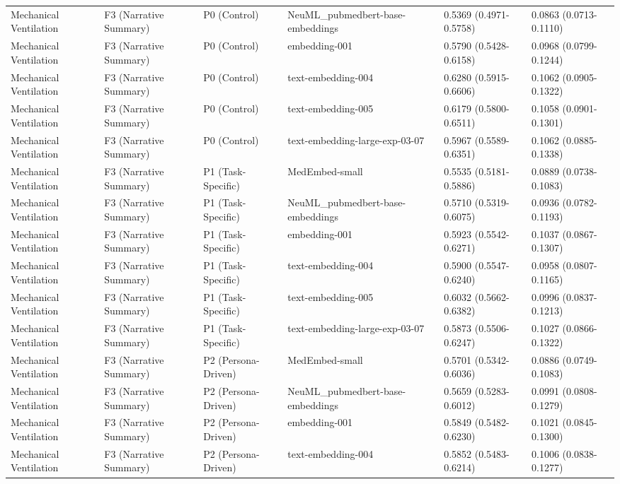 \begin{tabular}{llllll}
Mechanical Ventilation & F3 (Narrative Summary) & P0 (Control) & NeuML\_pubmedbert-base-embeddings & 0.5369 (0.4971-0.5758) & 0.0863 (0.0713-0.1110) \\
Mechanical Ventilation & F3 (Narrative Summary) & P0 (Control) & embedding-001 & 0.5790 (0.5428-0.6158) & 0.0968 (0.0799-0.1244) \\
Mechanical Ventilation & F3 (Narrative Summary) & P0 (Control) & text-embedding-004 & 0.6280 (0.5915-0.6606) & 0.1062 (0.0905-0.1322) \\
Mechanical Ventilation & F3 (Narrative Summary) & P0 (Control) & text-embedding-005 & 0.6179 (0.5800-0.6511) & 0.1058 (0.0901-0.1301) \\
Mechanical Ventilation & F3 (Narrative Summary) & P0 (Control) & text-embedding-large-exp-03-07 & 0.5967 (0.5589-0.6351) & 0.1062 (0.0885-0.1338) \\
Mechanical Ventilation & F3 (Narrative Summary) & P1 (Task-Specific) & MedEmbed-small & 0.5535 (0.5181-0.5886) & 0.0889 (0.0738-0.1083) \\
Mechanical Ventilation & F3 (Narrative Summary) & P1 (Task-Specific) & NeuML\_pubmedbert-base-embeddings & 0.5710 (0.5319-0.6075) & 0.0936 (0.0782-0.1193) \\
Mechanical Ventilation & F3 (Narrative Summary) & P1 (Task-Specific) & embedding-001 & 0.5923 (0.5542-0.6271) & 0.1037 (0.0867-0.1307) \\
Mechanical Ventilation & F3 (Narrative Summary) & P1 (Task-Specific) & text-embedding-004 & 0.5900 (0.5547-0.6240) & 0.0958 (0.0807-0.1165) \\
Mechanical Ventilation & F3 (Narrative Summary) & P1 (Task-Specific) & text-embedding-005 & 0.6032 (0.5662-0.6382) & 0.0996 (0.0837-0.1213) \\
Mechanical Ventilation & F3 (Narrative Summary) & P1 (Task-Specific) & text-embedding-large-exp-03-07 & 0.5873 (0.5506-0.6247) & 0.1027 (0.0866-0.1322) \\
Mechanical Ventilation & F3 (Narrative Summary) & P2 (Persona-Driven) & MedEmbed-small & 0.5701 (0.5342-0.6036) & 0.0886 (0.0749-0.1083) \\
Mechanical Ventilation & F3 (Narrative Summary) & P2 (Persona-Driven) & NeuML\_pubmedbert-base-embeddings & 0.5659 (0.5283-0.6012) & 0.0991 (0.0808-0.1279) \\
Mechanical Ventilation & F3 (Narrative Summary) & P2 (Persona-Driven) & embedding-001 & 0.5849 (0.5482-0.6230) & 0.1021 (0.0845-0.1300) \\
Mechanical Ventilation & F3 (Narrative Summary) & P2 (Persona-Driven) & text-embedding-004 & 0.5852 (0.5483-0.6214) & 0.1006 (0.0838-0.1277) \\

\end{tabular}
